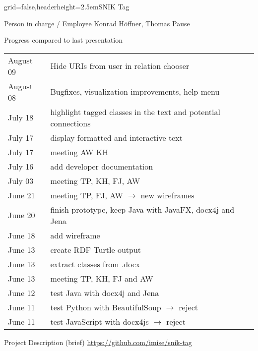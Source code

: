 \documentclass[english]{kiesgrube}
\begin{document}
\begin{poster}{grid=false,headerheight=2.5em}{}{SNIK Tag}{}{}
\begin{posterbox}[name=person,column=0,row=0]{Person in charge / Employee}
Konrad Höffner, Thomas Pause
\end{posterbox}
\begin{posterbox}[name=progress,below=person]{Progress compared to last presentation}
\footnotesize
\begin{tabulary}{\textwidth}{lL}
August 09	&Hide URIs from user in relation chooser\\
August 08	&Bugfixes, visualization improvements, help menu\\
July 18 &highlight tagged classes in the text and potential connections\\
July 17	&display formatted and interactive text\\
July 17	&meeting AW KH\\
July 16	&add developer documentation\\
July 03	&meeting TP, KH, FJ, AW\\
June 21	&meeting TP, FJ, AW $\rightarrow$ new wireframes\\
June 20	&finish prototype, keep Java with JavaFX, docx4j and Jena\\
June 18 &add wireframe\\
June 13 &create RDF Turtle output\\
June 13	&extract classes from .docx\\
June 13 &meeting TP, KH, FJ and AW\\
June 12	&test Java with docx4j and Jena\\
June 11	&test Python with BeautifulSoup $\rightarrow$ reject\\
June 11	&test JavaScript with docx4js $\rightarrow$ reject\\
\end{tabulary}
\end{posterbox}
\begin{posterbox}[name=description,column=1,row=0]{Project Description (brief)}
\url{https://github.com/imise/snik-tag}\\

\end{posterbox}
\end{poster}
\end{document}
